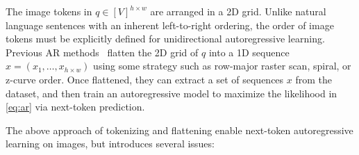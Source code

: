 \vspace{2pt}
The image tokens in $q \in [V]^{h\times w}$ are arranged in a 2D grid.
Unlike natural language sentences with an inherent left-to-right ordering, the order of image tokens must be explicitly defined for unidirectional autoregressive learning.
Previous AR methods~\cite{vqgan,vit-vqgan,rq} flatten the 2D grid of $q$ into a 1D sequence $x = (x_1, \dots, x_{h\times w})$ using some strategy such as row-major raster scan, spiral, or z-curve order.
Once flattened, they can extract a set of sequences $x$ from the dataset, and then train an autoregressive model to maximize the likelihood in \eqref{eq:ar} via next-token prediction.


The above approach of tokenizing and flattening enable next-token autoregressive learning on images, but introduces several issues:

